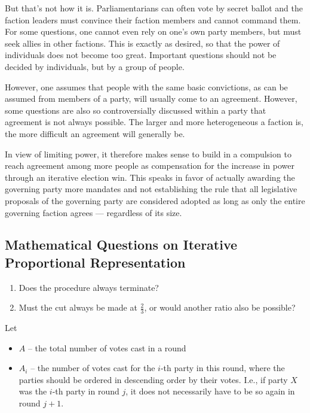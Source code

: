 But that's not how it is. Parliamentarians can often vote by secret ballot and the
faction leaders must convince their faction members and cannot
command them. For some questions, one cannot even rely on one's own party members,
but must seek allies in other factions. This is exactly as desired,
so that the power of individuals does not become too great. Important questions should not be
decided by individuals, but by a group of people.

However, one assumes that people
with the same basic convictions, as can be assumed from members of a party,
will usually come to an agreement. However, some questions are also so
controversially discussed within a party that agreement is not always possible. The larger and more heterogeneous a
faction is, the more difficult an agreement will generally be.

In view of
limiting power, it therefore makes sense to build in a compulsion to reach agreement among more people
as compensation for the increase in power through an iterative election win. This speaks in favor of
actually awarding the governing party more mandates and not establishing the rule that
all legislative proposals of the governing party are considered adopted as long as only the entire
governing faction agrees --- regardless of its size.

\subsection{Mathematical Questions on Iterative Proportional Representation}

\begin{enumerate}
  \item Does the procedure always terminate?
  \item Must the cut always be made at $\tfrac{2}{3}$, or would another
    ratio also be possible?
\end{enumerate}

Let

\begin{itemize}[label={}]
  \item $A$ -- the total number of votes cast in a round
  \item $A_i$ -- the number of votes cast for the $i$-th party in this round,
    where the parties should be ordered in descending order by their votes. I.e., if
    party $X$ was the $i$-th party in round $j$, it does not
    necessarily have to be so again in round $j+1$.
\end{itemize}

